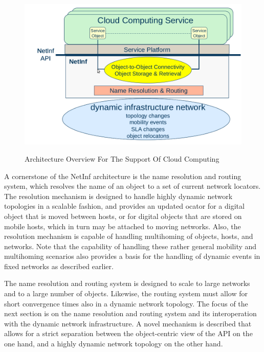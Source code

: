 \begin{figure}[h]
\begin{center}
\includegraphics[height=8cm]{4.png}
\caption{Architecture Overview For The Support Of Cloud Computing}
\end{center}
\end{figure}

A cornerstone of the NetInf architecture is the name
resolution and routing system, which resolves the name of an
object to a set of current network locators. The resolution
mechanism is designed to handle highly dynamic network
topologies in a scalable fashion, and provides an updated
ocator for a digital object that is moved between hosts, or
for digital objects that are stored on mobile hosts, which in
turn may be attached to moving networks. Also, the
resolution mechanism is capable of handling multihoming of
objects, hosts, and networks. Note that the capability of
handling these rather general mobility and multihoming
scenarios also provides a basis for the handling of dynamic
events in fixed networks as described earlier.

The name resolution and routing system is designed to
scale to large networks and to a large number of objects. Likewise, the routing system must allow for short
convergence times also in a dynamic network topology. The
focus of the next section is on the name resolution and
routing system and its interoperation with the dynamic
network infrastructure. A novel mechanism is described that
allows for a strict separation between the object-centric view
of the API on the one hand, and a highly dynamic network
topology on the other hand.

